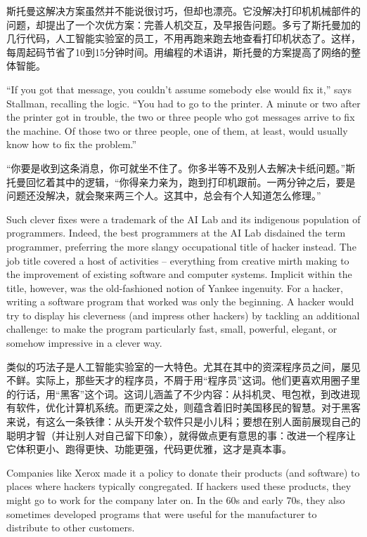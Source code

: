 \ifdefined\chs
斯托曼这解决方案虽然并不能说很讨巧，但却也漂亮。它没解决打印机机械部件的问题，却提出了一个次优方案：完善人机交互，及早报告问题。多亏了斯托曼加的几行代码，人工智能实验室的员工，不用再跑来跑去地查看打印机状态了。这样，每周起码节省了10到15分钟时间。用编程的术语讲，斯托曼的方案提高了网络的整体智能。
\fi

\ifdefined\eng
``If you got that message, you couldn't assume somebody else would fix it,'' says Stallman, recalling the logic. ``You had to go to the printer. A minute or two after the printer got in trouble, the two or three people who got messages arrive to fix the machine. Of those two or three people, one of them, at least, would usually know how to fix the problem.''
\fi

\ifdefined\chs
“你要是收到这条消息，你可就坐不住了。你多半等不及别人去解决卡纸问题。”斯托曼回忆着其中的逻辑，“你得亲力亲为，跑到打印机跟前。一两分钟之后，要是问题还没解决，就会聚来两三个人。这其中，总会有个人知道怎么修理。”
\fi

\ifdefined\eng
Such clever fixes were a trademark of the AI Lab and its indigenous population of programmers. Indeed, the best programmers at the AI Lab disdained the term programmer, preferring the more slangy occupational title of hacker instead. The job title covered a host of activities -- everything from creative mirth making to the improvement of existing software and computer systems. Implicit within the title, however, was the old-fashioned notion of Yankee ingenuity. For a hacker, writing a software program that worked was only the beginning. A hacker would try to display his cleverness (and impress other hackers) by tackling an additional challenge: to make the program particularly fast, small, powerful, elegant, or somehow impressive in a clever way.
\fi

\ifdefined\chs
类似的巧法子是人工智能实验室的一大特色。尤其在其中的资深程序员之间，屡见不鲜。实际上，那些天才的程序员，不屑于用“程序员”这词。他们更喜欢用圈子里的行话，用“黑客”这个词。这词儿涵盖了不少内容：从抖机灵、甩包袱，到改进现有软件，优化计算机系统。而更深之处，则蕴含着旧时美国移民的智慧。对于黑客来说，有这么一条铁律：从头开发个软件只是小儿科；要想在别人面前展现自己的聪明才智（并让别人对自己留下印象），就得做点更有意思的事：改进一个程序让它体积更小、跑得更快、功能更强，代码更优雅，这才是真本事。
\fi

\ifdefined\eng
Companies like Xerox made it a policy to donate their products (and software) to places where hackers typically congregated. If hackers used these products, they might go to work for the company later on.  In the 60s and early 70s, they also sometimes developed programs that were useful for the manufacturer to distribute to other customers.
\fi

